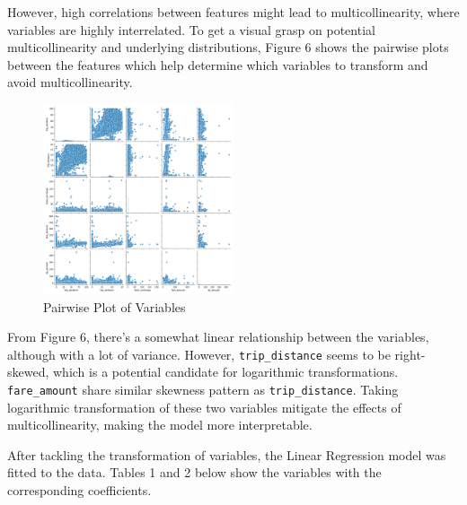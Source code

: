 \documentclass[11pt]{article}
\begin{document}
However, high correlations between features might lead to multicollinearity, where variables are highly interrelated. To get a visual grasp on potential multicollinearity and underlying distributions, Figure 6 shows the pairwise plots between the features which help determine which variables to transform and avoid multicollinearity. 

\begin{figure}[h!]
    \includegraphics[width=0.5\textwidth]{plots/features_pairwise_JFK.png}
    \centering
    \caption{Pairwise Plot of Variables} 
\end{figure}

From Figure 6, there's a somewhat linear relationship between the variables, although with a lot of variance. However, \texttt{trip\_distance} seems to be right-skewed, which is a potential candidate for logarithmic transformations. \texttt{fare\_amount} share similar skewness pattern as \texttt{trip\_distance}. Taking logarithmic transformation of these two variables mitigate the effects of multicollinearity, making the model more interpretable. 

After tackling the transformation of variables, the Linear Regression model was fitted to the data. Tables 1 and 2 below show the variables with the corresponding coefficients. 
\end{document}
